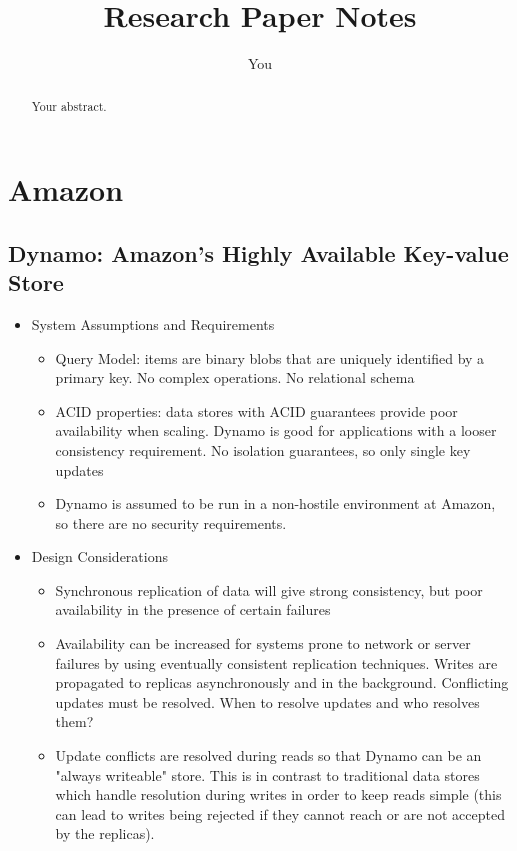 \documentclass[a4paper]{article}
\title{Research Paper Notes}
\author{You}
\begin{document}
\maketitle

\begin{abstract}
Your abstract.
\end{abstract}

\section{Amazon}

\subsection{Dynamo: Amazon's Highly Available Key-value Store}

\begin{itemize}
\item System Assumptions and Requirements
\begin{itemize}
\item Query Model: items are binary blobs that are uniquely identified by a primary key. No complex operations. No relational schema

\item  ACID properties: data stores with ACID guarantees provide poor availability when scaling. Dynamo is good for applications with a looser consistency requirement. No isolation guarantees, so only single key updates

\item Dynamo is assumed to be run in a non-hostile environment at Amazon, so there are no security requirements. 
\end{itemize}

\item Design Considerations
\begin{itemize}
\item Synchronous replication of data will give strong consistency, but poor availability in the presence of certain failures

\item Availability can be increased for systems prone to network or server failures by using eventually consistent replication techniques. Writes are propagated to replicas asynchronously and in the background. Conflicting updates must be resolved. When to resolve updates and who resolves them?

\item Update conflicts are resolved during reads so that Dynamo can be an "always writeable" store. This is in contrast to traditional data stores which handle resolution during writes in order to keep reads simple (this can lead to writes being rejected if they cannot reach or are not accepted by the replicas).


\end{itemize}
\end{itemize}
\end{document}
